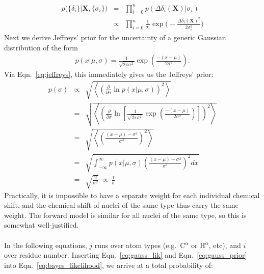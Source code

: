 \begin{eqnarray}
p\Big( \{\delta_i\} \Big| \mathbf X, \{\sigma_i\}\Big) & = & \prod_{i=0}^{n} p\left( \Delta\delta_i (\mathbf X)| \sigma_i \right)\nonumber\\
& \propto & \prod_{i=0}^{n} \frac{1}{\sigma_i } \exp{ \Bigg( - \frac{\Delta\delta_{i}(\mathbf X)^2}{2\sigma_i^2} \Bigg) }
    \label{eq:gauss_lik}
\end{eqnarray}
Next we derive Jeffreys' prior for the uncertainty of a generic Gaussian distribution of the form
\begin{eqnarray}
    p(x|\mu, \sigma) = \frac{1}{\sqrt{2\pi\sigma^2}} \exp \left( \frac{-(x-\mu)}{2\sigma^2} \right).
\end{eqnarray}
Via Eqn.~\ref{eq:jeffreys}, this immediately gives us the Jeffreys' prior:
\begin{eqnarray}
    p(\sigma)
    & \propto & \sqrt{\left\langle \left( \frac{\partial}{\partial\sigma}
        \ln p(x|\mu, \sigma) \right)^2 \right\rangle}\nonumber\\
    & = & \sqrt{\left\langle \left( \frac{\partial}{\partial\sigma}
        \ln \left[\frac{1}{\sqrt{2\pi\sigma^2}} \exp \left( \frac{-(x-\mu)}{2\sigma^2} \right) \right]
        \right)^2 \right\rangle}\nonumber\\
    & = & \sqrt{\left\langle \left(\frac{(x-\mu) - \sigma^2}{\sigma^3} \right)^2 \right\rangle}\nonumber\\
    & = & \sqrt{\int^{\infty}_{-\infty}  p(x|\mu, \sigma) \left(\frac{(x-\mu) - \sigma^2}{\sigma^3} \right)^2 dx}\nonumber\\
    & = &\sqrt{ \frac{2}{\sigma^2}} \ \propto \ \frac{1}{\sigma}
        \label{eq:gauss_prior}
\end{eqnarray}
Practically, it is impossible to have a separate weight for each individual chemical shift, and the chemical shift of nuclei of the same type thus carry the same weight.
The forward model is similar for all nuclei of the same type, so this is somewhat well-justified.
\\\\In the following equations, $j$ runs over atom types (e.g.~C$^\alpha$ or H$^\alpha$, etc), and $i$ over residue number.
Inserting Eqn.~\ref{eq:gauss_lik} and Eqn.~\ref{eq:gauss_prior} into Eqn.~\ref{eq:bayes_likelihood}, we arrive at a total probability of:
